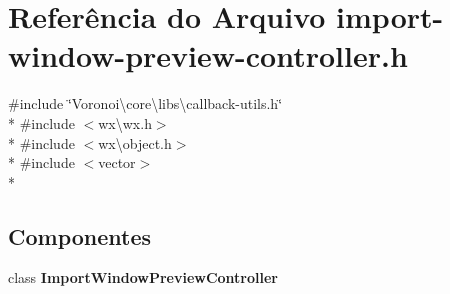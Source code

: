 \section{Referência do Arquivo import-\/window-\/preview-\/controller.h}
\label{import-window-preview-controller_8h}
{\ttfamily \#include \char`\"{}Voronoi\textbackslash{}core\textbackslash{}libs\textbackslash{}callback-\/utils.\+h\char`\"{}}\\*
{\ttfamily \#include $<$wx\textbackslash{}wx.\+h$>$}\\*
{\ttfamily \#include $<$wx\textbackslash{}object.\+h$>$}\\*
{\ttfamily \#include $<$vector$>$}\\*
\subsection*{Componentes}
\begin{DoxyCompactItemize}
\item 
class {\bf Import\+Window\+Preview\+Controller}
\end{DoxyCompactItemize}
